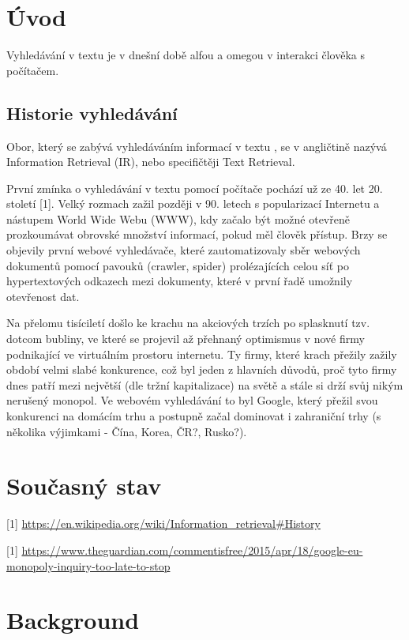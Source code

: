 \documentclass[11pt]{article}
\begin{document}
\section{Úvod}
Vyhledávání v textu je v dnešní době alfou a omegou v interakci člověka s
počítačem. 

\subsection{Historie vyhledávání}
Obor, který se zabývá vyhledáváním informací v textu , se v angličtině nazývá
Information Retrieval (IR), nebo specifičtěji Text Retrieval. 

První zmínka o vyhledávání v textu pomocí počítače pochází už ze 40. let 20.
století [1]. Velký rozmach zažil později v 90. letech s popularizací Internetu
a nástupem World Wide Webu (WWW), kdy začalo být možné otevřeně prozkoumávat
obrovské množství informací, pokud měl člověk přístup. Brzy se objevily první
webové vyhledávače, které zautomatizovaly sběr webových dokumentů pomocí
pavouků (crawler, spider) prolézajících celou síť po hypertextových odkazech
mezi dokumenty, které v první řadě umožnily otevřenost dat.

Na přelomu tisíciletí došlo ke krachu na akciových trzích po splasknutí tzv.
dotcom bubliny, ve které se projevil až přehnaný optimismus v nové firmy
podnikající ve virtuálním prostoru internetu. Ty firmy, které krach přežily
zažily období velmi slabé konkurence, což byl jeden z hlavních důvodů, proč
tyto firmy dnes patří mezi největší (dle tržní kapitalizace) na světě a stále
si drží svůj nikým nerušený monopol. Ve webovém vyhledávání to byl Google,
který přežil svou konkurenci na domácím trhu a postupně začal dominovat i
zahraniční trhy (s několika výjimkami - Čína, Korea, ČR?, Rusko?).

\section{Současný stav}

[1] \url{https://en.wikipedia.org/wiki/Information_retrieval#History}


[1] \url{https://www.theguardian.com/commentisfree/2015/apr/18/google-eu-monopoly-inquiry-too-late-to-stop}

\section{Background}
\end{document}
